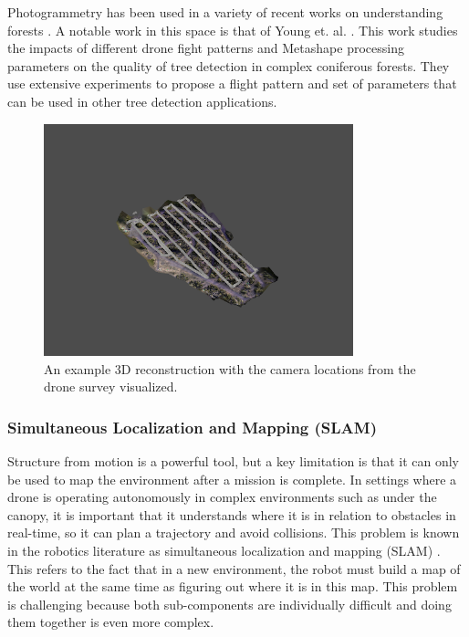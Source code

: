 Photogrammetry has been used in a variety of recent works on understanding forests \cite{Swayze2021InfluenceDensity, doi:10.1139/cjfr-2020-0433}. A notable work in this space is that of Young et. al. \cite{Young2022}. This work studies the impacts of different drone fight patterns and Metashape processing parameters on the quality of tree detection in complex coniferous forests. They use extensive experiments to propose a flight pattern and set of parameters that can be used in other tree detection applications.
\begin{figure}
    \centering
    \includegraphics[width=0.8\textwidth, trim={4cm 3cm 4cm 4cm}, clip]{figs/methods/structure_from_motion/camera estimation.png}
    \caption{An example 3D reconstruction with the camera locations from the drone survey visualized.}
    \label{fig:background:camera_locations}
\end{figure}


\subsubsection{Simultaneous Localization and Mapping (SLAM)}
Structure from motion is a powerful tool, but a key limitation is that it can only be used to map the environment after a mission is complete. In settings where a drone is operating autonomously in complex environments such as under the canopy, it is important that it understands where it is in relation to obstacles in real-time, so it can plan a trajectory and avoid collisions. This problem is known in the robotics literature as simultaneous localization and mapping (SLAM) \cite{durrant2006simultaneous}.
This refers to the fact that in a new environment, the robot must build a map of the world at the same time as figuring out where it is in this map.  This problem is challenging because both sub-components are individually difficult and doing them together is even more complex.

